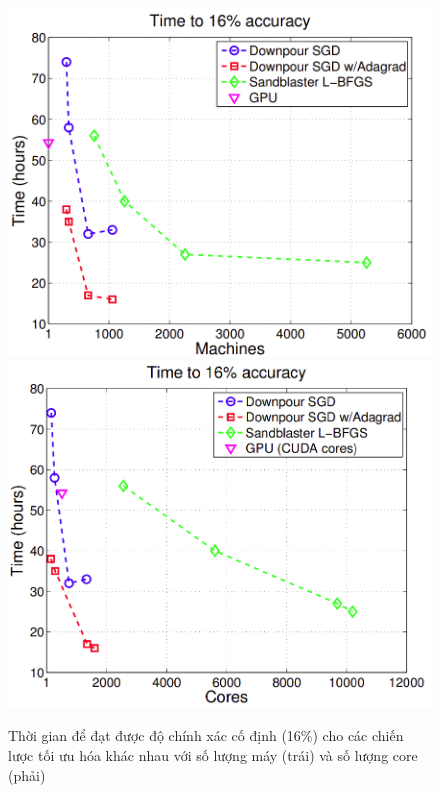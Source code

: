 \documentclass[11pt,a4paper]{article}
\numberwithin{equation}{subsection}
\numberwithin{figure}{subsection}
\numberwithin{table}{subsection}
\begin{document}
\begin{figure}[!h]
	\begin{center}
		\includegraphics[scale=0.39]{GG_4.PNG}
		\includegraphics[scale=0.39]{GG_5.PNG}
	\end{center}
	\caption{Thời gian để đạt được độ chính xác cố định (16\%) cho các chiến lược tối ưu hóa khác nhau với số lượng máy (trái) và số lượng core (phải)}
\end{figure}
\end{document}
